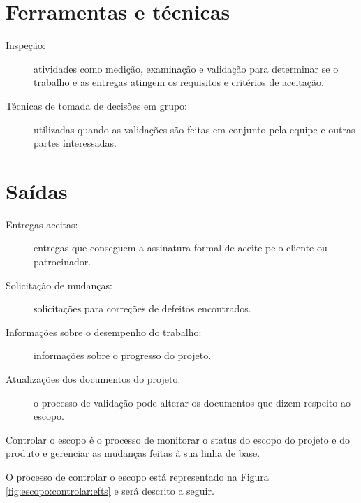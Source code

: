 \section{Ferramentas e técnicas}

\begin{description}
	
	\item[Inspeção:] atividades como medição, examinação e validação para determinar se o trabalho e as entregas atingem os requisitos e critérios de aceitação.
	
	\item[Técnicas de tomada de decisões em grupo:] utilizadas quando as validações são feitas em conjunto pela equipe e outras partes interessadas.
	
\end{description}

\section{Saídas}

\begin{description}
	
	\item[Entregas aceitas:] entregas que conseguem a assinatura formal de aceite pelo cliente ou patrocinador.
	
	\item[Solicitação de mudanças:] solicitações para correções de defeitos encontrados.
	
	\item[Informações sobre o desempenho do trabalho:] informações sobre o progresso do projeto.
	
	\item[Atualizações dos documentos do projeto:] o processo de validação pode alterar os documentos que dizem respeito ao escopo.
	
\end{description}



Controlar o escopo é o processo de monitorar o status do escopo do projeto e do produto e gerenciar as mudanças feitas à sua linha de base.

O processo de controlar o escopo está representado na Figura \ref{fig:escopo:controlar:efts} e será descrito a seguir.

